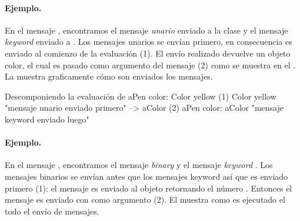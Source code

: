 \documentclass[a4paper,10pt,twoside]{book}
\begin{document}


\paragraph{Ejemplo.}
En el mensaje , encontramos el mensaje \emph{unario}  enviado a la clase  y el mensaje \emph{keyword}  enviado a . Los mensajes unarios se env\'ian primero, en consecuencia  es enviado al comienzo de la evaluaci\'on (1). El env\'io realizado devuelve un objeto color, el cual es pasado como argumento del mensaje  (2) como se muestra en el .
La  muestra graficamente c\'omo son enviados los mensajes.

\begin{example}[decColor]{Descomponiendo la evaluaci\'on de }{}
        aPen color: Color yellow
(1)                       Color yellow        "mensaje unario enviado primero"
                        --> aColor
(2)   aPen color: aColor                 "mensaje keyword enviado luego"
\end{example}

\paragraph{Ejemplo.} En el mensaje , encontramos el mensaje \emph{binary}  y el mensaje \emph{keyword} . Los mensajes binarios se env\'ian antes que los mensajes keyword as\'i que  es enviado primero (1): el mensaje  es enviado al objeto  retornando el número . Entonces el mensaje  es enviado con  como argumento (2).
El  muestra como es ejecutado el todo el env\'io de mensajes.
\end{document}
